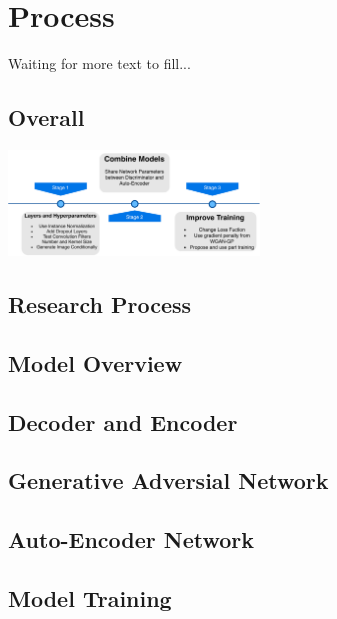 \section{Process}

Waiting for more text to fill...
\subsection{Overall}

\centering
\includegraphics[width=0.5\textwidth]{figures/roadmap.pdf}

\subsection{Research Process}
\subsection{Model Overview}
\subsection{Decoder and Encoder}
\subsection{Generative Adversial Network}
\subsection{Auto-Encoder Network}
\subsection{Model Training}
